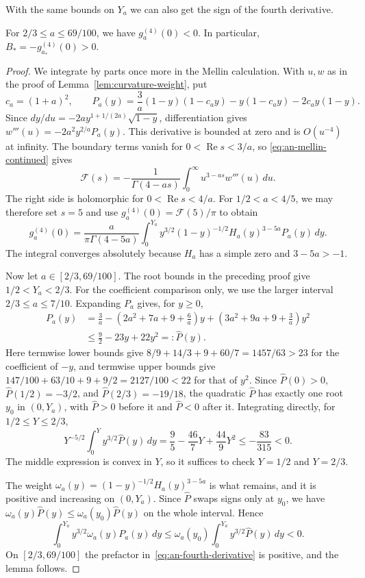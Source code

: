 With the same bounds on $Y_a$ we can also get the sign of the
fourth derivative.

\begin{lemma}\label{lem:analytic-quartic}
For $2/3\le a\le69/100$, we have $g_a^{(4)}(0)<0$.
In particular, $B_*=-g_{a_*}^{(4)}(0)>0$.
\end{lemma}

\begin{proof}
We integrate by parts once more in the Mellin calculation.
With $u,w$ as in the proof of Lemma~\ref{lem:curvature-weight}, put
\[
 c_a=(1+a)^2,\qquad
 P_a(y)=\frac3a(1-y)(1-c_ay)-y(1-c_ay)-2c_ay(1-y).
\]
Since $dy/du=-2ay^{1+1/(2a)}\sqrt{1-y}$, differentiation gives
$w'''(u)=-2a^2y^{2/a}P_a(y)$.
This derivative is bounded at zero and is $O(u^{-4})$ at infinity.
The boundary terms vanish for $0<\operatorname{Re}s<3/a$, so
\eqref{eq:an-mellin-continued} gives
\[
 \mathcal F(s)=-\frac1{\Gamma(4-as)}
                \int_0^\infty u^{3-as}w'''(u)\,d u.
\]
The right side is holomorphic for $0<\operatorname{Re}s<4/a$.
For $1/2<a<4/5$, we may therefore set $s=5$ and use
$g_a^{(4)}(0)=\mathcal F(5)/\pi$ to obtain
\begin{equation}\label{eq:an-fourth-derivative}
 g_a^{(4)}(0)=\frac{a}{\pi\Gamma(4-5a)}
 \int_0^{Y_a}y^{3/2}(1-y)^{-1/2}H_a(y)^{3-5a}P_a(y)\,d y.
\end{equation}
The integral converges absolutely because $H_a$ has a simple zero
and $3-5a>-1$.

Now let $a\in[2/3,69/100]$. The root bounds in the preceding proof
give $1/2<Y_a<2/3$. For the coefficient comparison only, we use
the larger interval $2/3\le a\le7/10$. Expanding $P_a$ gives, for $y\ge0$,
\[
 \begin{split}
 P_a(y)&=\frac3a-\left(2a^2+7a+9+\frac6a\right)y
                    +\left(3a^2+9a+9+\frac3a\right)y^2\\
       &\le\frac92-23y+22y^2=:\widehat P(y).
 \end{split}
\]
Here termwise lower bounds give
$8/9+14/3+9+60/7=1457/63>23$ for the coefficient of $-y$,
and termwise upper bounds give
$147/100+63/10+9+9/2=2127/100<22$ for that of $y^2$.
Since $\widehat P(0)>0$, $\widehat P(1/2)=-3/2$, and $\widehat P(2/3)=-19/18$,
the quadratic $\widehat P$ has exactly one root $y_0$ in $(0,Y_a)$,
with $\widehat P>0$ before it and $\widehat P<0$ after it. Integrating
directly, for $1/2\le Y\le2/3$,
\[
 Y^{-5/2}\int_0^Y y^{3/2}\widehat P(y)\,d y
 =\frac95-\frac{46}{7}Y+\frac{44}{9}Y^2
 \le-\frac{83}{315}<0.
\]
The middle expression is convex in $Y$, so it suffices to check
$Y=1/2$ and $Y=2/3$.

The weight $\omega_a(y)=(1-y)^{-1/2}H_a(y)^{3-5a}$ is what remains,
and it is positive and increasing on $(0,Y_a)$. Since $\widehat P$
swaps signs only at $y_0$, we have
$\omega_a(y)\widehat P(y)\le \omega_a(y_0)\widehat P(y)$ on the whole
interval. Hence
\[
 \int_0^{Y_a}y^{3/2}\omega_a(y)P_a(y)\,d y
 \le \omega_a(y_0)\int_0^{Y_a}y^{3/2}\widehat P(y)\,d y<0.
\]
On $[2/3,69/100]$ the prefactor in~\eqref{eq:an-fourth-derivative} is
positive, and the lemma follows.
\end{proof}

